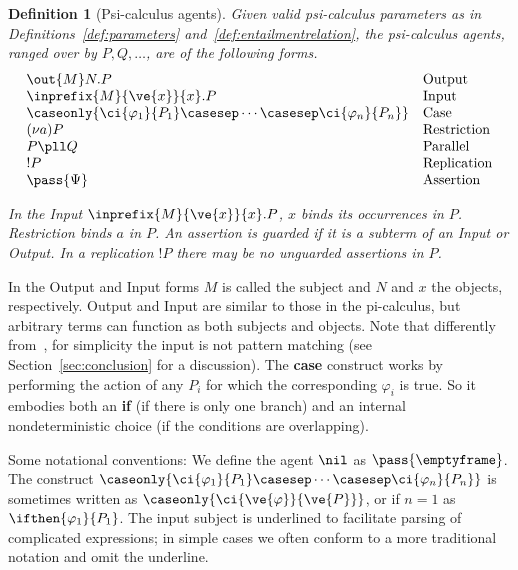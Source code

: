 \documentclass{eptcs}
\newtheorem{definition}{Definition}
\theoremstyle{definition}
\begin{document}
\begin{definition}[Psi-calculus agents]\label{def:agents}
Given valid psi-calculus parameters as in Definitions~\ref{def:parameters} and~\ref{def:entailmentrelation}, the psi-calculus {\em agents}, ranged over by $P,Q,\ldots$,  are of the following forms.
{\rm
\[
\begin{array}{ll}

\out{M}N .P                   & \mbox{Output} \\
\inprefix{M}{\ve{x}}{x}.P          & \mbox{Input}\\
\caseonly{\ci{\varphi_1}{P_1}\casesep\cdots\casesep\ci{\varphi_n}{P_n}}
&\mbox{Case} \\
(\nu a)P                      & \mbox{Restriction}\\
P \pll Q                      & \mbox{Parallel}\\
! P                           & \mbox{Replication} \\
\pass{\Psi}                        & \mbox{Assertion}\\
\end{array}\]
}

\noindent
In the Input $\inprefix{M}{\ve{x}}{x}.P$,  $x$ binds its occurrences in $P$. 
Restriction binds $a$ in $P$. An assertion is {\em guarded} if it is a subterm
of an Input or Output. In a replication $!P$ there may be no unguarded
assertions in $P$.
\end{definition}
In the Output and Input forms $M$ is called the subject and
$N$ and $x$ the objects, respectively.
Output and Input  are similar to those in the pi-calculus, but
arbitrary terms can function as both subjects and objects.
Note that differently from~\cite{bengtson.johansson.ea:psi-calculi},
for simplicity the input is not pattern matching (see
Section~\ref{sec:conclusion} for a discussion).
The {\bf case} construct works by performing the action of any
$P_i$ for which the corresponding $\varphi_i$ is true. So it
embodies both an {\bf if} (if there is only one branch) and an internal
nondeterministic choice (if the conditions are overlapping).

Some notational conventions: We define the agent $\nil$ as $\pass{\emptyframe}$.
The  construct 
$\caseonly{\ci{\varphi_1}{P_1}\casesep\cdots\casesep\ci{\varphi_n}{P_n}}$ is
sometimes written as
\mbox{\rm $\caseonly{\ci{\ve{\varphi}}{\ve{P}}}$}, or if $n=1$ as 
$\ifthen{\varphi_1}{P_1}$.
The input subject is underlined to facilitate parsing of complicated
expressions; in simple cases we often conform to a more traditional notation and
omit the underline.
\end{document}
